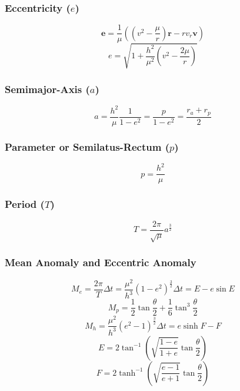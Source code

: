 \subsubsection{Eccentricity ($e$)}
\begin{equation}
    \mathbf{e} = \frac{1}{\mu}\left(\left(v^2-\frac{\mu}{r}\right)\mathbf{r}-rv_{r}\mathbf{v}\right)
\end{equation}
\begin{equation}
    e = \sqrt{1+\frac{h^2}{\mu^2}\left(v^2-\frac{2\mu}{r}\right)}
\end{equation}


\subsubsection{Semimajor-Axis ($a$)}
\begin{equation}
    a = \frac{h^2}{\mu}\frac{1}{1-e^2} = \frac{p}{1-e^2} = \frac{r_a + r_p}{2}
\end{equation}

\subsubsection{Parameter or Semilatus-Rectum ($p$)}
\begin{equation}
    p = \frac{h^2}{\mu}
\end{equation}


\subsubsection{Period ($T$)}
\begin{equation}
    T = \frac{2\pi}{\sqrt{\mu}}a^{\frac{3}{2}}
\end{equation}


\subsubsection{Mean Anomaly and Eccentric Anomaly}
\begin{equation}
    M_e = \frac{2\pi}{T}\Delta{}t = \frac{\mu^2}{h^3}\left(1-e^2\right)^\frac{3}{2}\Delta{}t = E - e\sin{E}
\end{equation}
\begin{equation}
    M_p = \frac{1}{2}\tan{\frac{\theta}{2}} + \frac{1}{6}\tan^{3}{\frac{\theta}{2}}
\end{equation}
\begin{equation}
    M_h = \frac{\mu^2}{h^3}\left(e^2-1\right)^\frac{3}{2}\Delta{}t = e\sinh{F}-F
\end{equation}
\begin{equation}
    E = 2\tan^{-1}{\left(\sqrt{\frac{1-e}{1+e}}\tan{\frac{\theta}{2}}\right)}
\end{equation}
\begin{equation}
    F = 2\tanh^{-1}{\left(\sqrt{\frac{e-1}{e+1}}\tan{\frac{\theta}{2}}\right)}
\end{equation}


